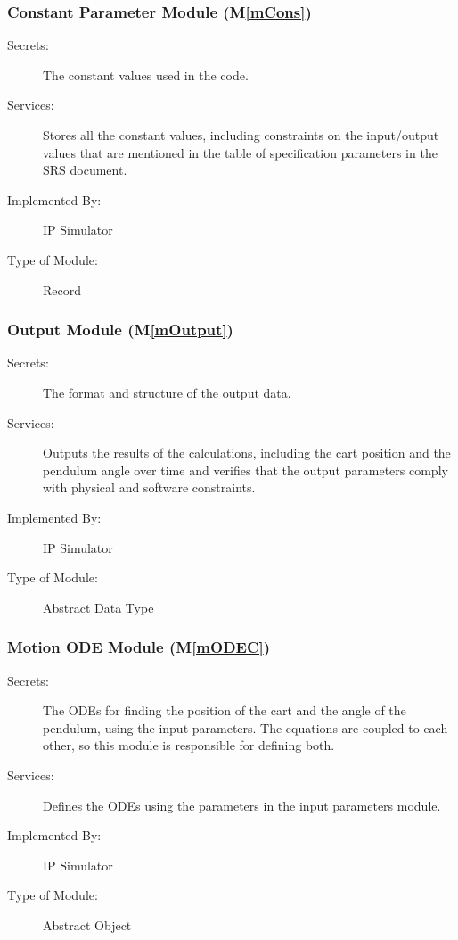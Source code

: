 \documentclass[12pt, titlepage]{article}
\newcommand{\mref}[1]{M\ref{#1}}
\begin{document}
\subsubsection{Constant Parameter Module (\mref{mCons})}
\begin{description}
\item[Secrets:] The constant values used in the code.
\item[Services:] Stores all the constant values, including constraints on the input/output values that are mentioned in the table of specification parameters in the SRS document.

\item[Implemented By:] IP Simulator
\item[Type of Module:] Record
\end{description} 
\subsubsection{Output Module (\mref{mOutput})}

\begin{description}
\item[Secrets:] The format and structure of the output data.
\item[Services:] Outputs the results of the calculations, including the cart position and the pendulum angle over time and verifies that the output parameters comply with physical and software constraints.
\item[Implemented By:] IP Simulator
\item[Type of Module:] Abstract Data Type
\end{description} 




\subsubsection{Motion ODE  Module (\mref{mODEC})}

\begin{description}
\item[Secrets:] The ODEs for finding the position of the cart and  the angle of the pendulum, using the input parameters. The equations are coupled to each other, so this module is responsible for defining both.
\item[Services:] Defines the ODEs using the parameters in the input parameters module.

\item[Implemented By:] IP Simulator
\item[Type of Module:] Abstract Object
\end{description} 
\end{document}
